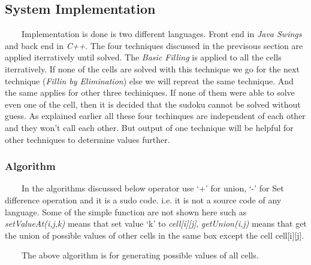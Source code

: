 \documentclass[12pt,a4paper]{article}
\begin{document}
\subsection{System Implementation}
\ \ \ \ Implementation is done is two different languages. Front end in \textit{Java Swings}  and back end in \textit{C++}. The four techniques discussed in the previsous section are applied iterratively until solved. The \textit{Basic Filling} is applied to all the cells iterratively. If none of the cells are solved with this technique we go for the next technique (\textit{Fillin by Elimination}) else we will repreat the same technique. And the same applies for other three techiniques. If none of them were able to solve even one of the cell, then it is decided that the sudoku cannot be solved without guess. As explained earlier all these four techinques are independent of each other and they won't call each other. But output of one technique will be helpful for other techniques to determine values further. 

\subsubsection{Algorithm}
\ \ \ \ In the algorithms discussed below operator use `+' for union, `-' for Set difference operation and it is a sudo code. i.e. it is not a source code of any language. Some of the simple function are not shown here such as \textit{setValueAt(i,j,k)} means that set value `k' to \textit{cell[i][j]}, \textit{getUnion(i,j)} means that get the union of possible values of other cells in the same box except the cell cell[i][j]. 
\begin{flushleft}
\verb%filter()%
\\* \verb%{%
\\* \verb%  for(i=0 to 8)%
\\* \verb%    for(j=0 to 8)%
\\* \verb%      cell[i][j].PossibleValues = {1,2., .. 9} - %
\\* \verb%                                  (row[i] + column[j] + BOX(i,j))%
\\* \verb%}%
\end{flushleft}

\ \ \ \ The above algorithm is for generating possible values of all cells.
\end{document}
